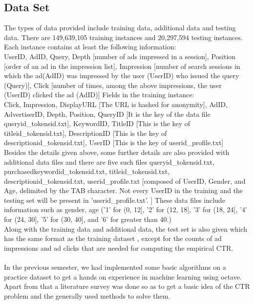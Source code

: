 \documentclass[10pt]{article}
\begin{document}
\subsection{Data Set}
The types of data provided include training data, additional data and testing data. There are 149,639,105 training instances and 20,297,594 testing instances.\\
Each instance contains at least the following information:\\
UserID, AdID, Query, Depth [number of ads impressed in a session], Position [order of an ad in the impression list], Impression [number of search sessions in which the ad(AdID) was impressed by the user (UserID) who issued the query (Query)], Click [number of times, among the above impressions, the user (UserID) clicked the ad (AdID)]
Fields in the training instance:\\
Click, Impression, DisplayURL [The URL is hashed for anonymity], AdID, AdvertiserID, Depth, Position, QueryID [It is the key of the data file queryid\_tokensid.txt], KeywordID, TitleID [This is the key of titleid\_tokensid.txt], DescriptionID [This is the key of descriptionid\_tokensid.txt], UserID [This is the key of userid\_profile.txt]\\
Besides the details given above, some further details are also provided with additional data files and there are five such files queryid\_tokensid.txt, purchasedkeywordid\_tokensid.txt, titleid\_tokensid.txt, descriptionid\_tokensid.txt, userid\_profile.txt [composed of UserID, Gender, and Age, delimited by the TAB character. Not every UserID in the training and the testing set will be present in 'userid\_profile.txt'. ]
These data files include information such as gender, age ('1'  for (0, 12],  '2' for (12, 18], '3' for (18, 24], '4'  for  (24, 30], '5' for (30,  40], and '6' for greater than 40.)\\
Along with the training data and additional data, the test set is also given which has the same format as the training dataset , except for the counts of ad impressions and ad clicks that are needed for computing the empirical CTR.
\\\\

In the previous semester, we had implemented some basic algorithms on a practice dataset to get a hands on experience in machine learning using octave. Apart from that a literature survey was done so as to get a basic idea of the CTR problem and the generally used methods to solve them. \\\\
\end{document}

